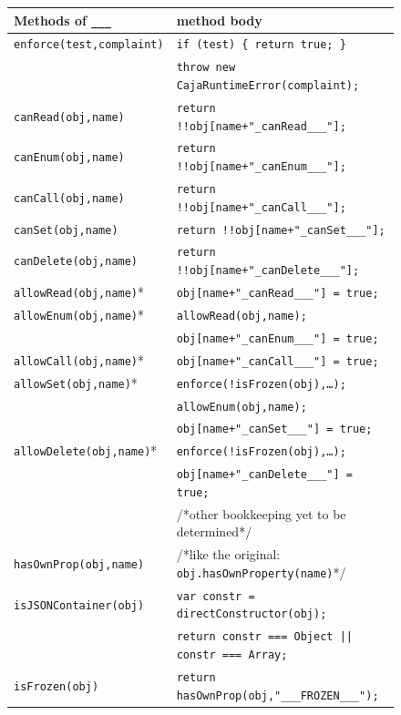 \documentclass[letterpaper,twocolumn,10pt]{article}
\newcommand{\code}[1]{{\tt {#1}}}              %
\begin{document}
\begin{figure}
\begin{tabular}{ll}
  Methods of \code{\_\_\_}  & method body \\ 
  \hline 
  \code{enforce(test,complaint)}
       & \code{if (test)\ \{ return true; \}} \\
       & \code{throw new CajaRuntimeError(complaint);} \\
  \hline
  \code{canRead(obj,name)}  
       & \code{return !!obj[name+"\_canRead\_\_\_"];} \\
  \code{canEnum(obj,name)}
       & \code{return !!obj[name+"\_canEnum\_\_\_"];} \\
  \code{canCall(obj,name)}
       & \code{return !!obj[name+"\_canCall\_\_\_"];} \\
  \code{canSet(obj,name)}
       & \code{return !!obj[name+"\_canSet\_\_\_"];} \\
  \code{canDelete(obj,name)}
       & \code{return !!obj[name+"\_canDelete\_\_\_"];} \\
  \hline
  \code{allowRead(obj,name)}* 
       & \code{obj[name+"\_canRead\_\_\_"] = true;} \\
  \code{allowEnum(obj,name)}* 
       & \code{allowRead(obj,name);} \\
       & \code{obj[name+"\_canEnum\_\_\_"] = true;} \\
  \code{allowCall(obj,name)}* 
       & \code{obj[name+"\_canCall\_\_\_"] = true;} \\
  \code{allowSet(obj,name)}* 
       & \code{enforce(!isFrozen(obj),\ldots);} \\
       & \code{allowEnum(obj,name);} \\
       & \code{obj[name+"\_canSet\_\_\_"] = true;}\\
  \code{allowDelete(obj,name)}* 
       & \code{enforce(!isFrozen(obj),\ldots);} \\
       & \code{obj[name+"\_canDelete\_\_\_"] = true;} \\
       & /*other bookkeeping yet to be determined*/ \\
  \hline
  \code{hasOwnProp(obj,name)} 
       & /*like the original: \code{obj.hasOwnProperty(name)}*/ \\
  \code{isJSONContainer(obj)} 
       & \code{var constr = directConstructor(obj);} \\
       & \code{return constr === Object || constr === Array;} \\ 
  \code{isFrozen(obj)} 
       & \code{return hasOwnProp(obj,"\_\_\_FROZEN\_\_\_");} \\

\end{tabular}
\end{figure}
\end{document}
